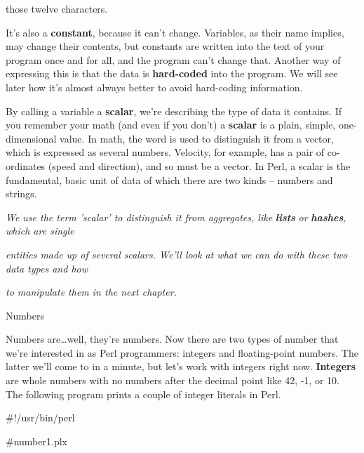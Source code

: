 \documentclass[a4paper,11pt]{book}
\begin{document}
\noindent those twelve characters.

\noindent 

\noindent It's also a \textbf{constant}, because it can't change. Variables, as their name implies, may change their contents, but constants are written into the text of your program once and for all, and the program can't change that. Another way of expressing this is that the data is \textbf{hard-coded }into the program. We will see later how it's almost always better to avoid hard-coding information.

\noindent  

\noindent 

\noindent By calling a variable a \textbf{scalar}, we're describing the type of data it contains. If you remember your math (and even if you don't) a \textbf{scalar }is a plain, simple, one-dimensional value. In math, the word is used to distinguish it from a vector, which is expressed as several numbers. Velocity, for example, has a pair of co-ordinates (speed and direction), and so must be a vector. In Perl, a scalar is the fundamental, basic unit of data of which there are two kinds -- numbers and strings.

\noindent 

\noindent \textit{We use the term 'scalar' to distinguish it from aggregates, like }\textbf{\textit{lists }}\textit{or }\textbf{\textit{hashes}}\textit{, which are single}

\noindent \textit{entities made up of several scalars. We'll look at what we can do with these two data types and how}

\noindent \textit{to manipulate them in the next chapter.}

\noindent 

\noindent 

\noindent Numbers

\noindent 

\noindent Numbers are\dots well, they're numbers. Now there are two types of number that we're interested in as Perl programmers: integers and floating-point numbers. The latter we'll come to in a minute, but let's work with integers right now. \textbf{Integers }are whole numbers with no numbers after the decimal point like 42, -1, or 10. The following program prints a couple of integer literals in Perl.

\noindent 

\noindent \#!/usr/bin/perl

\noindent \#number1.plx
\end{document}
